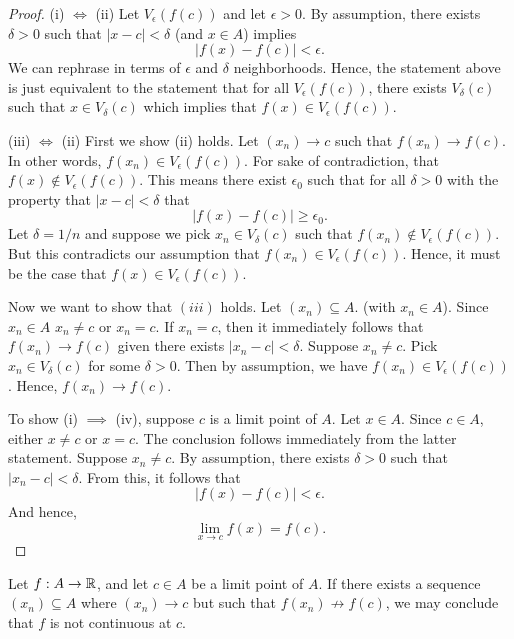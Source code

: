 \begin{proof}
    (i) \( \iff \) (ii) Let \( V_{\epsilon}(f(c)) \) and let \( \epsilon > 0  \). By assumption, there exists \( \delta > 0  \) such that \( | x - c  | < \delta \) (and \( x \in A  \)) implies 
    \[ | f(x) - f(c) | < \epsilon. \]
    We can rephrase in terms of \( \epsilon  \) and \( \delta \) neighborhoods. Hence, the statement above is just equivalent to the statement that for all \( V_{\epsilon }(f(c)) \), there exists \( V_{\delta}(c) \) such that \( x \in V_{\delta}(c) \) which implies that \( f(x) \in V_{\epsilon }(f(c)) \). 

     (iii) \( \iff \) (ii)  First we show (ii) holds. Let \( (x_n) \to c  \) such that \( f(x_n) \to f(c)  \). In other words, \( f(x_n) \in V_{\epsilon }(f(c)) \). For sake of contradiction, that \( f(x) \notin V_{\epsilon }(f(c)) \). This means there exist \( \epsilon_0  \) such that for all \( \delta > 0  \) with the property that \( | x - c  | < \delta \) that 
    \[  | f(x) - f(c)  | \geq \epsilon_0. \] Let \( \delta = 1 / n  \) and suppose we pick \( x_n \in V_{\delta}(c) \) such that \( f(x_n) \notin V_{\epsilon }(f(c)) \). But this contradicts our assumption that \( f(x_n) \in V_{\epsilon }(f(c)) \). Hence, it must be the case that \( f(x) \in V_{\epsilon }(f(c)) \).

    Now we want to show that \( (iii) \) holds. Let \( (x_n) \subseteq A  \).
    (with \( x_n \in A  \)). Since \( x_n \in A  \) \( x_n \neq c  \) or \( x_n = c  \). If \( x_n = c  \), then it immediately follows that \( f(x_n) \to f(c) \) given there exists \( | x_n  - c | < \delta \). Suppose \( x_n \neq c  \). Pick \( x_n \in V_{\delta}(c) \) for some \( \delta > 0  \). Then by assumption, we have \( f(x_n) \in V_{\epsilon }(f(c)) \). Hence, \( f(x_n) \to f(c) \).

    To show (i) \( \implies \) (iv), suppose \( c  \) is a limit point of \( A  \). Let \( x \in A  \). Since \( c \in A \), either \( x \neq c  \) or \( x = c  \). The conclusion follows immediately from the latter statement. Suppose \( x_n \neq c  \). By assumption, there exists \( \delta > 0  \) such that \( | x_n -c  | < \delta \). From this, it follows that 
    \[  |  f(x) - f(c)  | < \epsilon. \]
    And hence, 
    \[ \lim_{ x \to c } f(x) = f(c). \]
\end{proof}

\begin{corollary}
    Let \( f: A \to \mathbb{R}  \), and let \( c \in A  \) be a limit point of \( A  \). If there exists a sequence \( (x_n) \subseteq A  \) where \( (x_n) \to c  \) but such that \( f(x_n) \not \to f(c) \), we may conclude that \( f \) is not continuous at \( c \).
    \end{corollary}

